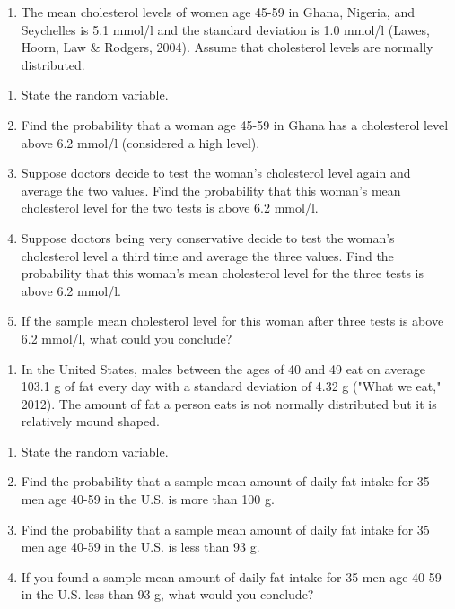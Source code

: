 \documentclass[
]{book}
\providecommand{\tightlist}{%
  \setlength{\itemsep}{0pt}\setlength{\parskip}{0pt}}
\begin{document}
\begin{enumerate}
\def\labelenumi{\arabic{enumi}.}
\setcounter{enumi}{5}
\tightlist
\item
  The mean cholesterol levels of women age 45-59 in Ghana, Nigeria, and Seychelles is 5.1 mmol/l and the standard deviation is 1.0 mmol/l (Lawes, Hoorn, Law \& Rodgers, 2004). Assume that cholesterol levels are normally distributed.
\end{enumerate}

\begin{enumerate}
\def\labelenumi{\alph{enumi}.}
\tightlist
\item
  State the random variable.
\item
  Find the probability that a woman age 45-59 in Ghana has a cholesterol level above 6.2 mmol/l (considered a high level).
\item
  Suppose doctors decide to test the woman's cholesterol level again and average the two values. Find the probability that this woman's mean cholesterol level for the two tests is above 6.2 mmol/l.
\item
  Suppose doctors being very conservative decide to test the woman's cholesterol level a third time and average the three values. Find the probability that this woman's mean cholesterol level for the three tests is above 6.2 mmol/l.
\item
  If the sample mean cholesterol level for this woman after three tests is above 6.2 mmol/l, what could you conclude?
\end{enumerate}

\begin{enumerate}
\def\labelenumi{\arabic{enumi}.}
\setcounter{enumi}{6}
\tightlist
\item
  In the United States, males between the ages of 40 and 49 eat on average 103.1 g of fat every day with a standard deviation of 4.32 g ("What we eat," 2012). The amount of fat a person eats is not normally distributed but it is relatively mound shaped.
\end{enumerate}

\begin{enumerate}
\def\labelenumi{\alph{enumi}.}
\tightlist
\item
  State the random variable.
\item
  Find the probability that a sample mean amount of daily fat intake for 35 men age 40-59 in the U.S. is more than 100 g.
\item
  Find the probability that a sample mean amount of daily fat intake for 35 men age 40-59 in the U.S. is less than 93 g.
\item
  If you found a sample mean amount of daily fat intake for 35 men age 40-59 in the U.S. less than 93 g, what would you conclude?
\end{enumerate}
\end{document}
